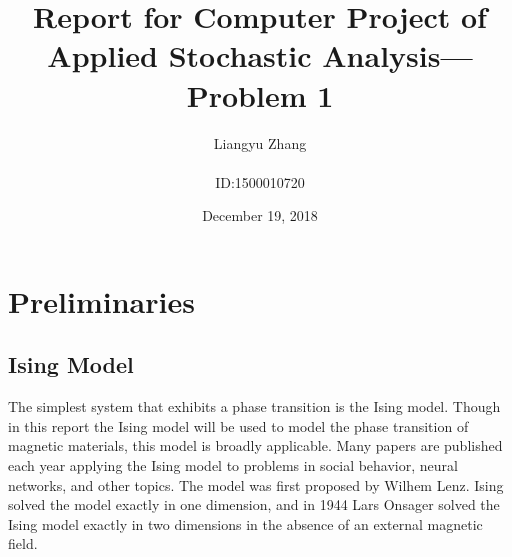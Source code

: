 \documentclass[a4paper]{article}
\title{Report for Computer Project of Applied Stochastic Analysis---Problem 1}
\author{Liangyu Zhang \\ \\ ID:1500010720}
\date{December 19, 2018}
\begin{document}
\maketitle

\section{Preliminaries}
\subsection{Ising Model}

The simplest system that exhibits a phase transition is the Ising model. Though in this report the Ising model will be used to model the phase transition of magnetic materials, this model is broadly applicable. Many papers are published each year applying the Ising model to problems in social behavior, neural networks, and other topics. The model was first proposed by Wilhem Lenz. Ising solved the model exactly in one dimension, and in 1944 Lars Onsager solved the Ising model exactly in two dimensions in the absence of an external magnetic field.
\end{document}
